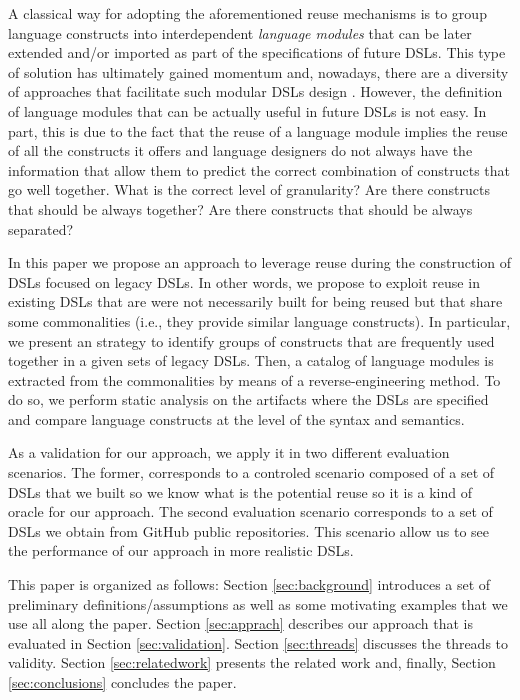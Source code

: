 A classical way for adopting the aforementioned reuse mechanisms is to group language constructs into interdependent \textit{language modules} that can be later extended and/or imported as part of the specifications of future DSLs. This type of solution has ultimately gained momentum and, nowadays, there are a diversity of approaches that facilitate such modular DSLs design \cite{Vacchi:2015,Mernik:2013,Rumpe:2010}. However, the definition of language modules that can be actually useful in future DSLs is not easy. In part, this is due to the fact that the reuse of a language module implies the reuse of all the constructs it offers and language designers do not always have the information that allow them to predict the correct combination of constructs that go well together. What is the correct level of granularity? Are there constructs that should be always together? Are there constructs that should be always separated?

In this paper we propose an approach to leverage reuse during the construction of DSLs focused on legacy DSLs. In other words, we propose to exploit reuse in existing DSLs that are were not necessarily built for being reused but that share some commonalities (i.e., they provide similar language constructs). In particular, we present an strategy to identify groups of constructs that are frequently used together in a given sets of legacy DSLs. Then, a catalog of language modules is extracted from the commonalities by means of a reverse-engineering method. To do so, we perform static analysis on the artifacts where the DSLs are specified and compare language constructs at the level of the syntax and semantics.

As a validation for our approach, we apply it in two different evaluation scenarios. The former, corresponds to a controled scenario composed of a set of DSLs that we built so we know what is the potential reuse so it is a kind of oracle for our approach. The second evaluation scenario corresponds to a set of DSLs we obtain from GitHub public repositories. This scenario allow us to see the performance of our approach in more realistic DSLs. 

This paper is organized as follows: Section \ref{sec:background} introduces a set of preliminary definitions/assumptions as well as some motivating examples that we use all along the paper. Section \ref{sec:apprach} describes our approach that is evaluated in Section \ref{sec:validation}. Section \ref{sec:threads} discusses the threads to validity. Section \ref{sec:relatedwork} presents the related work and, finally, Section \ref{sec:conclusions} concludes the paper. 

